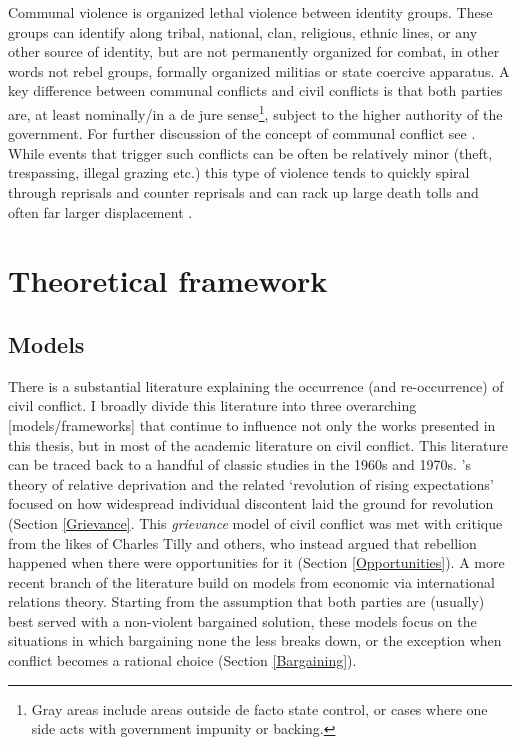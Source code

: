 Communal violence is organized lethal violence between identity groups. These
groups can identify along tribal, national, clan, religious, ethnic lines, or
any other source of identity, but are not permanently organized for combat, in
other words not rebel groups, formally organized militias or state coercive
apparatus. A key difference between communal conflicts and civil conflicts is
that both parties are, at least nominally/in a de jure sense\footnote{Gray
        areas include areas outside de facto state control, or cases where one
side acts with government impunity or backing.}, subject to the higher
authority of the government. For further discussion of the concept of communal
conflict see \citet{BroscheJohan2012Cccw}. While events that trigger such
conflicts can be often be relatively minor (theft, trespassing, illegal
grazing etc.) this type of violence tends to quickly spiral through reprisals
and counter reprisals and can rack up large death tolls and often far larger
displacement \citep{Horowitz_2001}. 

\section{Theoretical framework}
\label{Theoretical framework}

\subsection{Models} \label{Models}

There is a substantial literature explaining the occurrence (and re-occurrence)
of civil conflict. I broadly divide this literature into three overarching
[models/frameworks] that continue to influence not only the works presented in
this thesis, but in most of the academic literature on civil conflict. This
literature can be traced back to a handful of classic studies in the 1960s and
1970s. \citet{GurrTedRobert1970Wmr}'s theory of relative deprivation and the
related `revolution of rising expectations' \citep{Davies_1962} focused on how
widespread individual discontent laid the ground for revolution (Section
\ref{Grievance}. This \textit{grievance} model of civil conflict was met with
critique from the likes of Charles Tilly and  others, who instead argued that
rebellion happened when there were opportunities for it (Section
\ref{Opportunities}). A more recent branch of the literature build on models
from economic via international relations theory. Starting from the assumption
that both parties are (usually) best served with a non-violent bargained
solution, these models focus on the situations in which bargaining none the less
breaks down, or the exception when conflict becomes a rational choice (Section
\ref{Bargaining}).

